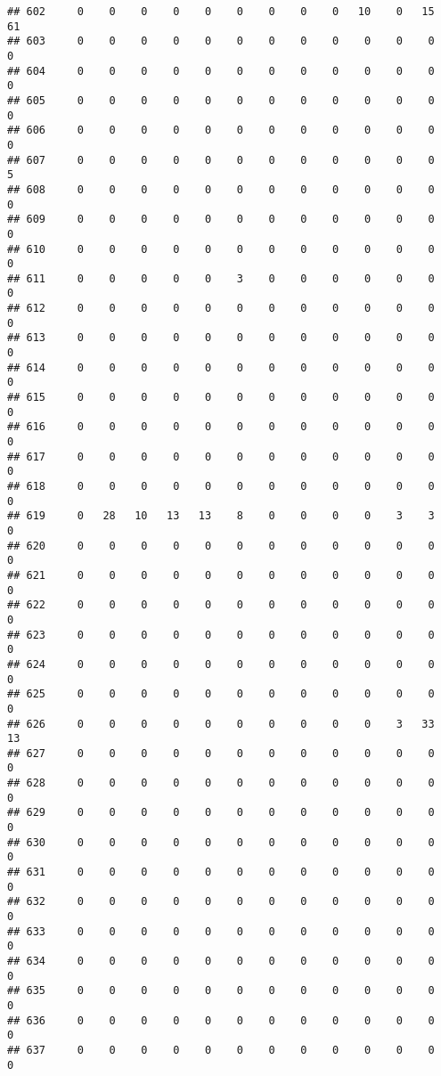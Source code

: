 \documentclass[]{article}
\begin{document}
\begin{verbatim}
## 602     0    0    0    0    0    0    0    0    0   10    0   15   61
## 603     0    0    0    0    0    0    0    0    0    0    0    0    0
## 604     0    0    0    0    0    0    0    0    0    0    0    0    0
## 605     0    0    0    0    0    0    0    0    0    0    0    0    0
## 606     0    0    0    0    0    0    0    0    0    0    0    0    0
## 607     0    0    0    0    0    0    0    0    0    0    0    0    5
## 608     0    0    0    0    0    0    0    0    0    0    0    0    0
## 609     0    0    0    0    0    0    0    0    0    0    0    0    0
## 610     0    0    0    0    0    0    0    0    0    0    0    0    0
## 611     0    0    0    0    0    3    0    0    0    0    0    0    0
## 612     0    0    0    0    0    0    0    0    0    0    0    0    0
## 613     0    0    0    0    0    0    0    0    0    0    0    0    0
## 614     0    0    0    0    0    0    0    0    0    0    0    0    0
## 615     0    0    0    0    0    0    0    0    0    0    0    0    0
## 616     0    0    0    0    0    0    0    0    0    0    0    0    0
## 617     0    0    0    0    0    0    0    0    0    0    0    0    0
## 618     0    0    0    0    0    0    0    0    0    0    0    0    0
## 619     0   28   10   13   13    8    0    0    0    0    3    3    0
## 620     0    0    0    0    0    0    0    0    0    0    0    0    0
## 621     0    0    0    0    0    0    0    0    0    0    0    0    0
## 622     0    0    0    0    0    0    0    0    0    0    0    0    0
## 623     0    0    0    0    0    0    0    0    0    0    0    0    0
## 624     0    0    0    0    0    0    0    0    0    0    0    0    0
## 625     0    0    0    0    0    0    0    0    0    0    0    0    0
## 626     0    0    0    0    0    0    0    0    0    0    3   33   13
## 627     0    0    0    0    0    0    0    0    0    0    0    0    0
## 628     0    0    0    0    0    0    0    0    0    0    0    0    0
## 629     0    0    0    0    0    0    0    0    0    0    0    0    0
## 630     0    0    0    0    0    0    0    0    0    0    0    0    0
## 631     0    0    0    0    0    0    0    0    0    0    0    0    0
## 632     0    0    0    0    0    0    0    0    0    0    0    0    0
## 633     0    0    0    0    0    0    0    0    0    0    0    0    0
## 634     0    0    0    0    0    0    0    0    0    0    0    0    0
## 635     0    0    0    0    0    0    0    0    0    0    0    0    0
## 636     0    0    0    0    0    0    0    0    0    0    0    0    0
## 637     0    0    0    0    0    0    0    0    0    0    0    0    0

\end{verbatim}
\end{document}
